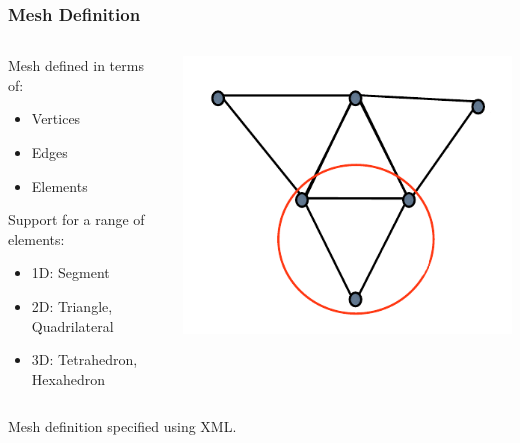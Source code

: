 \documentclass{beamer}
\numberwithin{figure}{section}
\numberwithin{equation}{section}
\begin{document}
\begin{frame}
\frametitle{Mesh Definition}
\begin{minipage}[c][0.8\textheight][t]{\linewidth}
\begin{columns}
\begin{column}[l]{7cm}
    Mesh defined in terms of:
    \begin{itemize}
      \item Vertices
      \item Edges
      \item Elements
    \end{itemize}
    \bigskip
    Support for a range of elements:
    \begin{itemize}
      \item 1D: Segment
      \item 2D: Triangle, Quadrilateral
      \item 3D: Tetrahedron, Hexahedron
    \end{itemize}
\end{column}
\begin{column}[l]{4cm}
    \includegraphics[width=\textwidth]{mesh}
\end{column}
\end{columns}
    \bigskip
    Mesh definition specified using XML.
\end{minipage}
\end{frame}
\end{document}
